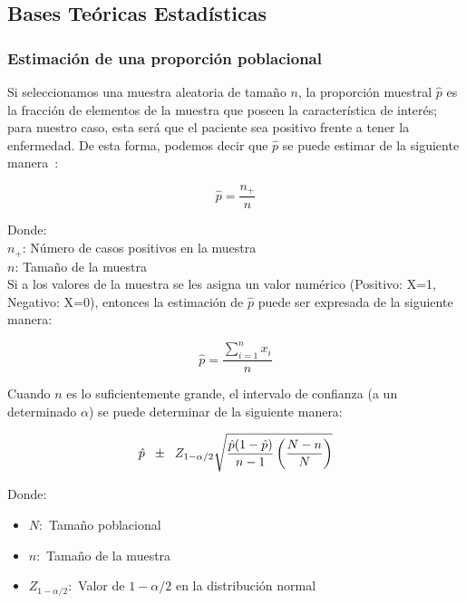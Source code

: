 \newpage
\subsection{Bases Teóricas Estadísticas}
\subsubsection{Estimación de una proporción poblacional}
Si seleccionamos una muestra aleatoria de tamaño $n$, la proporción muestral $\hat{p}$ es la fracción de elementos de la muestra que poseen la característica de interés; para nuestro caso, esta será que el paciente sea positivo frente a tener la enfermedad. De esta forma, podemos decir que $\hat{p}$ se puede estimar de la siguiente manera~\cite{scheaffer2006elementos}:

\begin{equation*}
    \hat{p} = \frac{n_+}{n}
\end{equation*}

Donde:\\
\hspace*{2cm} $n_+$: Número de casos positivos en la muestra\\
\hspace*{2cm} $n$\hspace*{0.27cm}: Tamaño de la muestra\\

Si a los valores de la muestra se les asigna un valor numérico (Positivo: X=1, Negativo: X=0), entonces la estimación de $\hat{p}$ puede ser expresada de la siguiente manera:

\begin{equation}
    \hat{p} = \frac{\sum_{i=1}^{n}{x_i}}{n}
\end{equation}

Cuando $n$ es lo suficientemente grande, el intervalo de confianza (a un determinado $\alpha$) se puede determinar de la siguiente manera:

\begin{equation}
    \hat{p} \hspace{0.2cm} \pm \hspace{0.2cm} Z_{1-\alpha/2} \sqrt{\frac{\hat{p}(1-\hat{p})}{n-1} \left( \frac{N-n}{N} \right)}
\end{equation}

Donde:

\begin{itemize}
    \item[] $N:$ Tamaño poblacional
    \item[] $n:$ Tamaño de la muestra
    \item[] $Z_{1-\alpha/2}:$ Valor de $1-\alpha/2$ en la distribución normal
\end{itemize}

